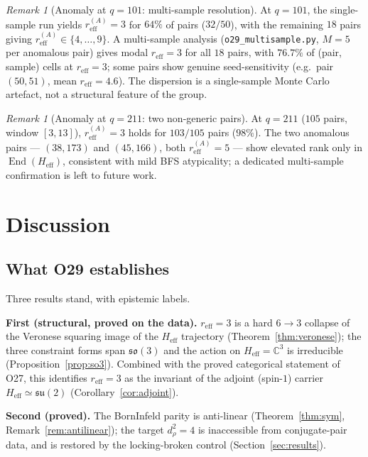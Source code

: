 \documentclass[12pt,a4paper]{article}
\theoremstyle{remark}
\newtheorem{remark}[theorem]{Remark}
\DeclareMathOperator{\End}{End}
\newcommand{\su}{\mathfrak{su}}
\newcommand{\Heff}{H_{\mathrm{eff}}}
\newcommand{\reff}{r_{\mathrm{eff}}}
\begin{document}
      \begin{remark}[Anomaly at $q = 101$: multi-sample resolution]
        \label{rem:q101}
        At $q = 101$, the single-sample run yields $\reff^{(A)} = 3$ for $64\%$ of pairs ($32/50$), with the
        remaining $18$ pairs giving $\reff^{(A)} \in \{4, \ldots, 9\}$.
        A multi-sample analysis (\texttt{o29\_multisample.py}, $M = 5$ per anomalous pair) gives modal $\reff = 3$ for
        all $18$ pairs, with $76.7\%$ of (pair, sample) cells at $\reff = 3$; some pairs show genuine
        seed-sensitivity (e.g.\ pair $(50,51)$, mean $\reff = 4.6$).
        The dispersion is a single-sample Monte Carlo artefact, not a structural feature of the group.
      \end{remark}

      \begin{remark}[Anomaly at $q = 211$: two non-generic pairs]
        \label{rem:q211}
        At $q = 211$ ($105$ pairs, window $[3, 13]$), $\reff^{(A)} = 3$ holds for $103/105$ pairs ($98\%$).
        The two anomalous pairs --- $(38, 173)$ and $(45, 166)$, both $\reff^{(A)} = 5$ --- show elevated rank only in
        $\End(\Heff)$, consistent with mild BFS atypicality; a dedicated multi-sample confirmation is left to future
        work.
      \end{remark}

  \section{Discussion}

    \subsection{What O29 establishes}

      Three results stand, with epistemic labels.

      \textbf{First (structural, proved on the data).}
      $\reff = 3$ is a hard $6 \to 3$ collapse of the Veronese squaring image of the $\Heff$ trajectory
      (Theorem~\ref{thm:veronese}); the three constraint forms span $\mathfrak{so}(3)$ and the action on
      $\Heff = \mathbb{C}^3$ is irreducible (Proposition~\ref{prop:so3}).
      Combined with the proved categorical statement of O27, this identifies $\reff = 3$ as the invariant of the
      adjoint (spin-$1$) carrier $\Heff \simeq \su(2)$ (Corollary~\ref{cor:adjoint}).

      \textbf{Second (proved).}
      The Born\textendash{}Infeld parity is anti-linear (Theorem~\ref{thm:sym}, Remark~\ref{rem:antilinear}); the
      target $d_\rho^2 = 4$ is inaccessible from conjugate-pair data, and is restored by the locking-broken control
      (Section~\ref{sec:results}).
\end{document}
